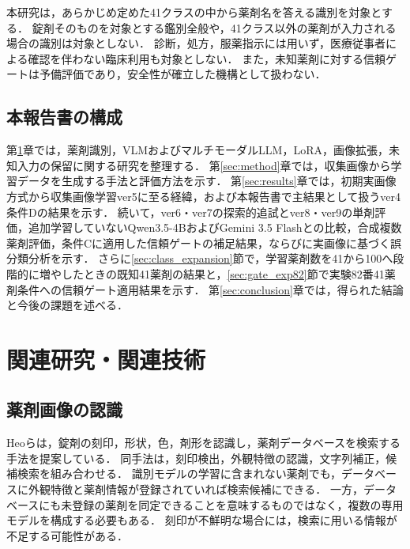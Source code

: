 \documentclass[uplatex,dvipdfmx]{jsarticle}
\begin{document}
本研究は，あらかじめ定めた41クラスの中から薬剤名を答える識別を対象とする．
錠剤そのものを対象とする鑑別全般や，41クラス以外の薬剤が入力される場合の識別は対象としない．
診断，処方，服薬指示には用いず，医療従事者による確認を伴わない臨床利用も対象としない．
また，未知薬剤に対する信頼ゲートは予備評価であり，安全性が確立した機構として扱わない．

\subsection{本報告書の構成}

第\ref{sec:related}章では，薬剤識別，VLMおよびマルチモーダルLLM，LoRA，画像拡張，未知入力の保留に関する研究を整理する．
第\ref{sec:method}章では，収集画像から学習データを生成する手法と評価方法を示す．
第\ref{sec:results}章では，初期実画像方式から収集画像学習ver5に至る経緯，および本報告書で主結果として扱うver4条件Dの結果を示す．
続いて，ver6・ver7の探索的追試とver8・ver9の単剤評価，追加学習していないQwen3.5-4BおよびGemini 3.5 Flashとの比較，合成複数薬剤評価，条件Cに適用した信頼ゲートの補足結果，ならびに実画像に基づく誤分類分析を示す．
さらに\ref{sec:class_expansion}節で，学習薬剤数を41から100へ段階的に増やしたときの既知41薬剤の結果と，\ref{sec:gate_exp82}節で実験82番41薬剤条件への信頼ゲート適用結果を示す．
第\ref{sec:conclusion}章では，得られた結論と今後の課題を述べる．

\clearpage

\section{関連研究・関連技術}\label{sec:related}

\subsection{薬剤画像の認識}

Heoらは，錠剤の刻印，形状，色，剤形を認識し，薬剤データベースを検索する手法を提案している\cite{heo2023pill}．
同手法は，刻印検出，外観特徴の認識，文字列補正，候補検索を組み合わせる．
識別モデルの学習に含まれない薬剤でも，データベースに外観特徴と薬剤情報が登録されていれば検索候補にできる．
一方，データベースにも未登録の薬剤を同定できることを意味するものではなく，複数の専用モデルを構成する必要もある．
刻印が不鮮明な場合には，検索に用いる情報が不足する可能性がある．
\end{document}
